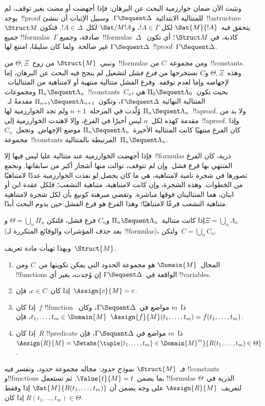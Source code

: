 \documentclass[../../../include/open-logic-section]{subfiles}
\begin{document}


ونثبت الآن ضمان خوارزمية البحث عن البرهان: فإذا أجهضت أو مضت بغير توقف،
لم يوجد~!!{proof} للمتتالية الابتدائية~$\Gamma \Sequent \Delta$. وسبيل
الإثبات أن ننشئ~!!a{structure}~$\Struct M$ يتحقق فيه~$\Sat{M}{!A}$ لكل
$!A \in \Gamma$، و$\Sat/{M}{!A}$ لكل~$!A \in \Delta$. فتكون جميع
!!{formula}s~$\Gamma$ صادقة، وجميع~!!{formula}s~$\Delta$ كاذبة، في
$\Struct M$؛ أي تكون~$\Gamma \Sequent \Delta$ غير صالحة. ولما كان
 سليمًا، امتنع لها~!!{proof}~$\Gamma \Sequent \Delta$.

ونبني~$\Struct{M}$ من زوج~$\Theta,\Xi$ من~!!{formula}s ومن مجموعة~$C$
من~!!{constant}s. وهذه~$\Theta,\Xi$ و$C$ نستخرجها من \emph{فرع فشل}
لتشغيل لم ينجح فيه البحث عن البرهان، إما لإجهاضه وإما لعدم توقفه. وفرع
الفشل متتالية
منتهية أو لامتناهية من المتتاليات~$\Pi_n \Sequent \Lambda_n$
ومجموعات~!!{constant}s~$C_n$، بحيث
تكون~$\Pi_0 \Sequent \Lambda_0$ هي المتتالية النهائية
$\Gamma \Sequent \Delta$، وتكون~$\Pi_{n+1} \Sequent \Lambda_{n+1}$ مقدمةً
لـ~$\Pi_n \Sequent \Lambda_n$ وُلّدت في المرحلة~$n+1$ ولم تجد الخوارزمية
لها~!!a{proof}. ولا بد من مقدمة كهذه لكل~$n$ ليس أخيرًا في الفرع، وإلا
لاهتدت الخوارزمية إلى~!!a{proof}. وإذا كان الفرع منتهيًا كانت
المتتالية الأخيرة~$\Pi_n \Sequent \Lambda_n$ موضع الإجهاض. ونجعل~$C_n$
مجموعة~!!{constant}s المرتبطة بالمتتالية~$\Pi_n \Sequent \Lambda_n$.

فإذا أجهضت الخوارزمية عند متتالية عليا ليس فيها إلا~!!{formula}s ذرية،
كان الفرع المنتهي بها فرع فشل. وإن لم تتوقف، توالت منها أشجار أكبر من
سابقاتها. ونجمع تصورها في شجرة نامية لامتناهية، هي ما كان يحصل لو نفذت
الخوارزمية عددًا لامتناهيًا من الخطوات. وهذه الشجرة، وإن كانت لامتناهية،
متناهية التشعب؛ فلكل عقدة ابن أو ابنان، هما المتتاليتان فوقها مباشرة.
وتقضي مبرهنة كونيغ بأن لكل شجرة لامتناهية متناهية التشعب فرعًا لامتناهيًا؛
وهذا الفرع هو فرع الفشل حين يدوم البحث أبدًا.

إذا كانت متتالية~$\Pi_n \Sequent \Lambda_n$ و$C_n$ فرع فشل، فلتكن
$\Theta=\bigcup_n\Pi_n$ و$\Xi=\bigcup_n\Lambda_n$ (بعد حذف المؤشرات
والوقائع المتكررة لـ~!!{formula}s)، ولتكن~$C=\bigcup_n C_n$.

وبهذا تهيأت مادة تعريف~$\Struct{M}$.
\begin{enumerate}
\item المجال~$\Domain{M}$ هو مجموعة الحدود التي يمكن تكوينها من~$C$ ومن
!!{function}s الواقعة في~$\Gamma \Sequent \Delta$ إن وُجدت، بغير أي
!!{variable}s.
\item إذا كان~$c\in C$، فإن~$\Assign{c}{M}=c$.
\item إذا كان~$f$ !!{function} ذا~$m$ مواضع في~$\Gamma \Sequent \Delta$،
وكان~$t_1,\dots,t_m\in\Domain{M}$، فإن
$\Assign{f}{M}(t_1,\dots,t_m)=f(t_1,\dots,t_m)$.
\item إذا كان~$R$ !!{predicate} ذا~$m$ مواضع في
$\Gamma \Sequent \Delta$، فإن
$\Assign{R}{M}=\Setabs{\tuple{t_1,\dots,t_m}\in\Domain{M}^m}
{R(t_1,\dots,t_m)\in\Theta}$.
\end{enumerate}
فـ~$\Struct{M}$ \emph{نموذج حدود}: مجاله مجموعة حدود، وتفسر فيه
!!{constant}s و!!{function}s بما يضمن~$\Value{t}{M}=t$. ثم تستعمل
!!{formula}s الذرية في~$\Theta$ لتعريف~$\Assign{R}{M}$ على وجه يضمن أن
$\Sat{M}{R(t_1,\dots,t_m)}$ إذا وفقط إذا كان
$R(t_1,\dots,t_m)\in\Theta$.
\end{document}
